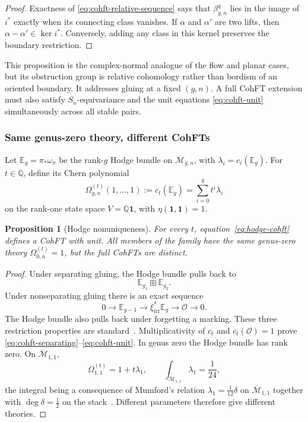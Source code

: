 \documentclass[11pt,letterpaper,twoside]{article}
\theoremstyle{plain}
\newtheorem{proposition}[theorem]{Proposition}
\theoremstyle{definition}
\theoremstyle{remark}
\let\cite\citep
\begin{document}
\begin{proof}
Exactness of \eqref{eq:cohft-relative-sequence} says that \(\beta_{g,n}^q\) lies in the image of \(i^*\) exactly when its connecting class vanishes.  If \(\alpha\) and \(\alpha'\) are two lifts, then \(\alpha-\alpha'\in\ker i^*\).  Conversely, adding any class in this kernel preserves the boundary restriction.
\end{proof}

This proposition is the complex-normal analogue of the flow and planar cases, but its obstruction group is relative cohomology rather than bordism of an oriented boundary.  It addresses gluing at a fixed \((g,n)\).  A full CohFT extension must also satisfy \(S_n\)-equivariance and the unit equations \eqref{eq:cohft-unit} simultaneously across all stable pairs.

\subsubsection{Same genus-zero theory, different CohFTs}

Let \(\mathbb E_g=\pi_*\omega_\pi\) be the rank-\(g\) Hodge bundle on \(\overline{\mathcal M}_{g,n}\), with \(\lambda_i=c_i(\mathbb E_g)\).  For \(t\in\mathbb Q\), define its Chern polynomial
\begin{equation}\label{eq:hodge-cohft}
 \Omega^{(t)}_{g,n}(1,\ldots,1)
 :=
 c_t(\mathbb E_g)
 =\sum_{i=0}^g t^i\lambda_i
\end{equation}
on the rank-one state space \(V=\mathbb Q\mathbf1\), with \(\eta(\mathbf1,\mathbf1)=1\).

\begin{proposition}[Hodge nonuniqueness]\label{prop:hodge-cohft}
For every \(t\), equation~\eqref{eq:hodge-cohft} defines a CohFT with unit.  All members of the family have the same genus-zero theory \(\Omega^{(t)}_{0,n}=1\), but the full CohFTs are distinct.
\end{proposition}

\begin{proof}
Under separating gluing, the Hodge bundle pulls back to
\[
 \mathbb E_{g_1}\boxplus\mathbb E_{g_2}.
\]
Under nonseparating gluing there is an exact sequence
\[
 0\longrightarrow\mathbb E_{g-1}
 \longrightarrow\xi_{\mathrm{irr}}^*\mathbb E_g
 \longrightarrow\mathcal O\longrightarrow0.
\]
The Hodge bundle also pulls back under forgetting a marking.  These three restriction properties are standard~\cite{mumford1983,acg2011}.  Multiplicativity of \(c_t\) and \(c_t(\mathcal O)=1\) prove \eqref{eq:cohft-separating}--\eqref{eq:cohft-unit}.  In genus zero the Hodge bundle has rank zero.  On \(\overline{\mathcal M}_{1,1}\),
\[
 \Omega^{(t)}_{1,1}=1+t\lambda_1,
 \qquad
 \int_{\overline{\mathcal M}_{1,1}}\lambda_1=\frac1{24},
\]
the integral being a consequence of Mumford's relation \(\lambda_1=\tfrac1{12}\delta\) on \(\overline{\mathcal M}_{1,1}\) together with \(\deg\delta=\tfrac12\) on the stack~\cite{mumford1983}.  Different parameters therefore give different theories.
\end{proof}
\end{document}
